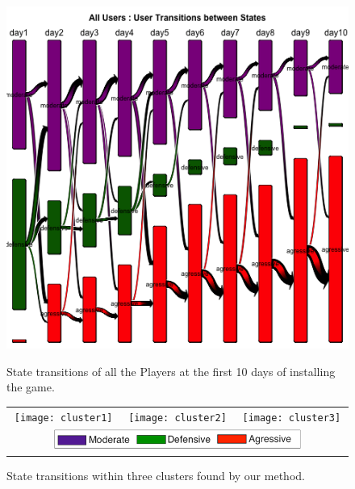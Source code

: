 \begin{figure}[h]
\begin{minipage}[b]{0.3\linewidth}
    \centering
    \includegraphics[width=0.8\linewidth]{transitions} 
    \caption{State transitions of all the Players at the first 10 days of installing the game.}
    \label{fig:transitions}
\end{minipage}
\quad
\begin{minipage}[b]{0.65\linewidth}
    \centering
        \begin{tabular}{ccc}
         \texttt{[image: cluster1]} &
         \texttt{[image: cluster2]} &
         \texttt{[image: cluster3]} \\
         \multicolumn{3}{c}{ \includegraphics[width=0.75\textwidth]{legend} }
         \end{tabular}
     \caption{\label{fig:clusters} State transitions within three clusters found by our method.}
\end{minipage}
\end{figure}

%



